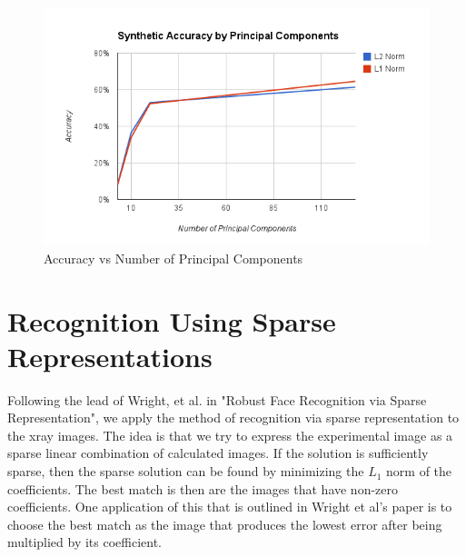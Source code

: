\documentclass[12pt,letterpaper]{article}
\begin{document}
\begin{figure}[ht]
  \begin{center}
    \includegraphics[scale=0.8]{figs/accuracy_by_num_pc.png}
    \caption{Accuracy vs Number of Principal Components}
  \end{center}
\end{figure}
\clearpage

\section{Recognition Using Sparse Representations}
Following the lead of Wright, et al. in "Robust Face Recognition via Sparse
Representation", we apply the method of recognition via sparse representation
to the xray images. The idea is that we try to express the experimental image as
a sparse linear combination of calculated images. If the solution is
sufficiently sparse, then the sparse solution can be found by minimizing the
$L_1$ norm of the coefficients.  The best match is then are the images that have
non-zero coefficients. One application of this that is outlined in Wright et
al's paper is to choose the best match as the image that produces the lowest
error after being multiplied by its coefficient.
\end{document}
